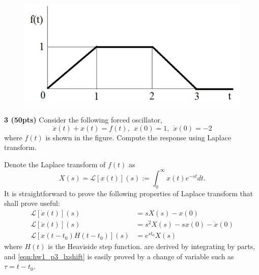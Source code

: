 \begin{problem}
    \begin{figure}
        \vspace{-0.5cm}
        \centering
        \includegraphics[width=0.82\linewidth]{homework/hw1/assets/hw1_p3.png}
    \end{figure}
    \textbf{3 (50pts)} Consider the following forced oscillator,
    \begin{equation}
        \ddot{x}(t) + x(t) = f(t), ~~ x(0) = 1, ~~ \dot{x}(0) = -2
    \end{equation}
    where $f(t)$ is shown in the figure. Compute the response
    using Laplace transform.  
\end{problem}
Denote the Laplace transform of $f(t)$ as 
\begin{equation}
    X(s) = \mathcal{L}[x(t)](s) := \int_0^\infty x(t) e^{-st} dt.
\end{equation}
It is straightforward to prove the following properties of Laplace transform that shall prove useful:
\begin{align}
    \mathcal{L}[\dot{x}(t)](s) &= sX(s) - x(0) \label{eqn:hw1_p3_lxdot} \\
    \mathcal{L}[\ddot{x}(t)](s) &= s^2 X(s) - sx(0) - \dot{x}(0) \label{eqn:hw1_p3_lxddot}  \\
    \mathcal{L}[x(t-t_0) H(t-t_0)](s) &= e^{st_0} X(s) \label{eqn:hw1_p3_lxshift} 
\end{align}
where $H(t)$ is the Heaviside step function. 
 are derived by integrating by parts, and \cref{eqn:hw1_p3_lxshift} is easily proved by a change of variable such as $\tau = t - t_0$.


